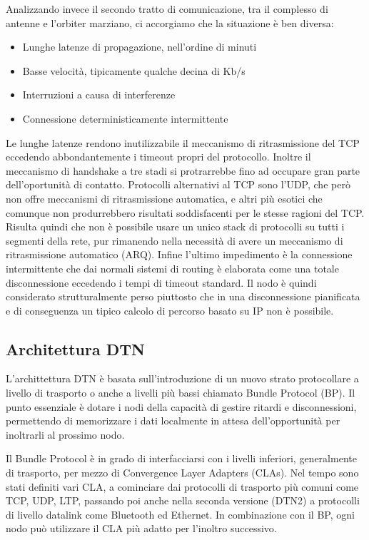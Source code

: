 \documentclass[a4paper]{article}
\begin{document}
		Analizzando invece il secondo tratto di comunicazione, tra il complesso di antenne e l'orbiter marziano, ci accorgiamo che la situazione è ben diversa:
		\begin{itemize}
			\item Lunghe latenze di propagazione, nell'ordine di minuti
			\item Basse velocità, tipicamente qualche decina di Kb/s
			\item Interruzioni a causa di interferenze
			\item Connessione deterministicamente intermittente
		\end{itemize}
		Le lunghe latenze rendono inutilizzabile il meccanismo di ritrasmissione del TCP eccedendo abbondantemente i timeout propri del protocollo. Inoltre il meccanismo di handshake a tre stadi si protrarrebbe fino ad occupare gran parte dell'oportunità di contatto. Protocolli alternativi al TCP sono l'UDP, che però non offre meccanismi di ritrasmissione automatica, e altri più esotici che comunque non produrrebbero risultati soddisfacenti per le stesse ragioni del TCP.
		Risulta quindi che non è possibile usare un unico stack di protocolli su tutti i segmenti della rete, pur rimanendo nella necessità di avere un meccanismo di ritrasmissione automatico (ARQ). 
		Infine l'ultimo impedimento è la connessione intermittente che dai normali sistemi di routing è elaborata come una totale disconnessione eccedendo i tempi di timeout standard. Il nodo è quindi considerato strutturalmente perso piuttosto che in una disconnessione pianificata e di conseguenza un tipico calcolo di percorso basato su IP non è possibile.
		
		
		\subsection{Architettura DTN}		
		
		L'archittettura DTN è basata sull'introduzione di un nuovo strato protocollare a livello di trasporto o anche a livelli più bassi chiamato Bundle Protocol (BP). Il punto essenziale è dotare i nodi della capacità di gestire ritardi e disconnessioni, permettendo di memorizzare i dati localmente in attesa dell'opportunità per inoltrarli al prossimo nodo. 
		
		Il Bundle Protocol è in grado di interfacciarsi con i livelli inferiori, generalmente di trasporto, per mezzo di Convergence Layer Adapters (CLAs). Nel tempo sono stati definiti vari CLA, a cominciare dai protocolli di trasporto più comuni come TCP, UDP, LTP, passando poi anche nella seconda versione (DTN2) a protocolli di livello datalink come Bluetooth ed Ethernet. 
		In combinazione con il BP, ogni nodo può utilizzare il CLA più adatto per l'inoltro successivo. 
		
\end{document}
